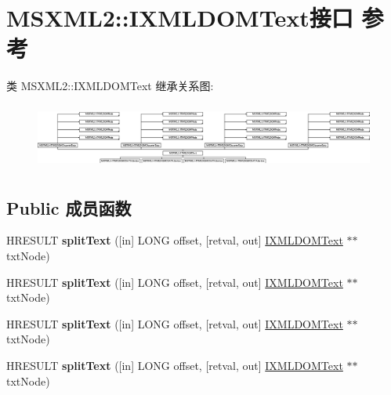 \hypertarget{interface_m_s_x_m_l2_1_1_i_x_m_l_d_o_m_text}{}\section{M\+S\+X\+M\+L2\+:\+:I\+X\+M\+L\+D\+O\+M\+Text接口 参考}
\label{interface_m_s_x_m_l2_1_1_i_x_m_l_d_o_m_text}
类 M\+S\+X\+M\+L2\+:\+:I\+X\+M\+L\+D\+O\+M\+Text 继承关系图\+:\begin{figure}[H]
\begin{center}
\leavevmode
\includegraphics[height=2.187500cm]{interface_m_s_x_m_l2_1_1_i_x_m_l_d_o_m_text}
\end{center}
\end{figure}
\subsection*{Public 成员函数}
\begin{DoxyCompactItemize}
\item 
\mbox{\label{interface_m_s_x_m_l2_1_1_i_x_m_l_d_o_m_text_afb216e51e022391ae7b23ecca810b7ad}} 
H\+R\+E\+S\+U\+LT {\bfseries split\+Text} (\mbox{[}in\mbox{]} L\+O\+NG offset, \mbox{[}retval, out\mbox{]} \hyperlink{interface_m_s_x_m_l2_1_1_i_x_m_l_d_o_m_text}{I\+X\+M\+L\+D\+O\+M\+Text} $\ast$$\ast$txt\+Node)
\item 
\mbox{\label{interface_m_s_x_m_l2_1_1_i_x_m_l_d_o_m_text_afb216e51e022391ae7b23ecca810b7ad}} 
H\+R\+E\+S\+U\+LT {\bfseries split\+Text} (\mbox{[}in\mbox{]} L\+O\+NG offset, \mbox{[}retval, out\mbox{]} \hyperlink{interface_m_s_x_m_l2_1_1_i_x_m_l_d_o_m_text}{I\+X\+M\+L\+D\+O\+M\+Text} $\ast$$\ast$txt\+Node)
\item 
\mbox{\label{interface_m_s_x_m_l2_1_1_i_x_m_l_d_o_m_text_afb216e51e022391ae7b23ecca810b7ad}} 
H\+R\+E\+S\+U\+LT {\bfseries split\+Text} (\mbox{[}in\mbox{]} L\+O\+NG offset, \mbox{[}retval, out\mbox{]} \hyperlink{interface_m_s_x_m_l2_1_1_i_x_m_l_d_o_m_text}{I\+X\+M\+L\+D\+O\+M\+Text} $\ast$$\ast$txt\+Node)
\item 
\mbox{\label{interface_m_s_x_m_l2_1_1_i_x_m_l_d_o_m_text_afb216e51e022391ae7b23ecca810b7ad}} 
H\+R\+E\+S\+U\+LT {\bfseries split\+Text} (\mbox{[}in\mbox{]} L\+O\+NG offset, \mbox{[}retval, out\mbox{]} \hyperlink{interface_m_s_x_m_l2_1_1_i_x_m_l_d_o_m_text}{I\+X\+M\+L\+D\+O\+M\+Text} $\ast$$\ast$txt\+Node)
\end{DoxyCompactItemize}
